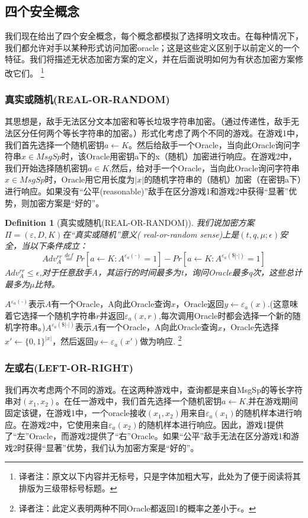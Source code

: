\documentclass[]{article}
\newtheorem{definition}{Definition}
\begin{document}
\subsection{四个安全概念}
我们现在给出了四个安全概念，每个概念都模拟了选择明文攻击。在每种情况下，我们都允许对手以某种形式访问加密oracle；这是这些定义区别于以前定义的一个特征。我们将描述无状态加密方案的定义，并在后面说明如何为有状态加密方案修改它们。
\footnote{译者注：原文以下内容并无标号，只是字体加粗大写，此处为了便于阅读将其排版为三级带标号标题。}
\par

\subsubsection{真实或随机(REAL-OR-RANDOM)}

其思想是，敌手无法区分文本加密和等长垃圾字符串加密。（通过传递性，敌手无法区分任何两个等长字符串的加密。）形式化考虑了两个不同的游戏。在游戏1中，我们首先选择一个随机密钥$a\leftarrow K$。然后给敌手一个Oracle，当向此Oracle询问字符串$x\in MsgSp$时，该Oracle用密钥a下的x（随机）加密进行响应。在游戏2中，我们开始选择随机密钥$a\in K$,然后，给对手一个Oracle，当向此Oracle询问字符串$x\in MsgSp$时，Oracle用它用长度为$|x|$的随机字符串的（随机）加密（在密钥a下）进行响应。如果没有“公平(reasonable)”敌手在区分游戏1和游戏2中获得“显著”优势，则加密方案是“好的”。\par

\begin{definition}[真实或随机(REAL-OR-RANDOM)]
	我们说加密方案$\Pi =(\varepsilon,D,K)$在“真实或随机”意义( real-or-random sense)上是$(t,q,\mu;\epsilon)$安全，当以下条件成立：
	\[Adv_A^{rr} \stackrel{def}{=} Pr[a\leftarrow K:A^{\varepsilon_a(\cdot)}=1] - Pr[a\leftarrow K : A^{\varepsilon_a(\$|\cdot|)}=1]\]
	$Adv_A^{rr} \leq \epsilon$,对于任意敌手A，其运行的时间最多为t，询问Oracle最多q次，这些总计最多为$\mu$比特。
\end{definition}

$A^{\varepsilon_a(\cdot)}$表示$A$有一个Oracle，A向此Oracle查询$x$，Oracle返回$y\leftarrow \varepsilon_a(x)$.(这意味着它选择一个随机字符串$r$并返回$\varepsilon_a (x,r)$,每次调用Oracle时都会选择一个新的随机字符串。)$A^{\varepsilon_a(\$|\cdot|)}$表示$A$有一个Oracle，A向此Oracle查询$x$，Oracle先选择$x'\leftarrow \{0,1\}^{|x|}$，然后返回$y\leftarrow \varepsilon_a(x')$做为响应.
\footnote{译者注：此定义表明两种不同Oracle都返回1的概率之差小于$\epsilon$。}

\subsubsection{左或右(LEFT-OR-RIGHT)}
我们再次考虑两个不同的游戏。在这两种游戏中，查询都是来自MsgSp的等长字符串对$(x_1,x_2)$。在任一游戏中，我们首先选择一个随机密钥$a\leftarrow K$,并在游戏期间固定该键，在游戏1中，一个oracle接收$(x_1,x_2)$用来自$\varepsilon_a(x_1)$的随机样本进行响应。在游戏2中，它使用来自$\varepsilon_a(x_2)$的随机样本进行响应。因此，游戏1提供了“左”Oracle，而游戏2提供了“右”Oracle。如果“公平”敌手无法在区分游戏1和游戏2时获得“显著”优势，我们认为加密方案是“好的”。
\end{document}
